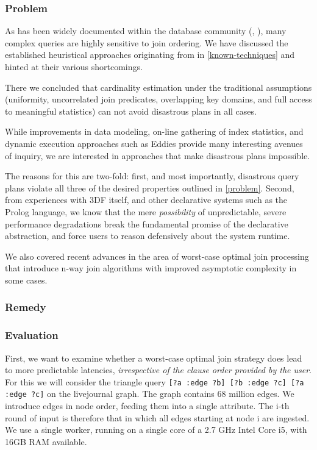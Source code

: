 \documentclass[../catalog.tex]{subfiles}
\begin{document}
\subsubsection{Problem}

As has been widely documented within the database community
(\cite{leis2015good}, \cite{lohman2014query}), many complex queries
are highly sensitive to join ordering. We have discussed the
established heuristical approaches originating from
\cite{selinger1979access} in \ref{known-techniques} and hinted at
their various shortcomings.

There we concluded that cardinality estimation under the traditional
assumptions (uniformity, uncorrelated join predicates, overlapping key
domains, and full access to meaningful statistics) can not avoid
disastrous plans in all cases.

While improvements in data modeling, on-line gathering of index
statistics, and dynamic execution approaches such as Eddies provide
many interesting avenues of inquiry, we are interested in approaches
that make disastrous plans impossible.

The reasons for this are two-fold: first, and most importantly,
disastrous query plans violate all three of the desired properties
outlined in \ref{problem}. Second, from experiences with 3DF itself,
and other declarative systems such as the Prolog language, we know
that the mere \emph{possibility} of unpredictable, severe performance
degradations break the fundamental promise of the declarative
abstraction, and force users to reason defensively about the system
runtime.

We also covered recent advances in the area of worst-case optimal join
processing that introduce n-way join algorithms with improved
asymptotic complexity in some cases.

\subsubsection{Remedy}

\subsubsection{Evaluation}

First, we want to examine whether a worst-case optimal join strategy
does lead to more predictable latencies, \emph{irrespective of the
  clause order provided by the user}. For this we will consider the
triangle query \texttt{[?a :edge ?b] [?b :edge ?c] [?a :edge ?c]} on
the livejournal graph. The graph contains 68 million edges. We
introduce edges in node order, feeding them into a single
attribute. The i-th round of input is therefore that in which all
edges starting at node i are ingested. We use a single worker, running
on a single core of a 2.7 GHz Intel Core i5, with 16GB RAM available.
\end{document}
